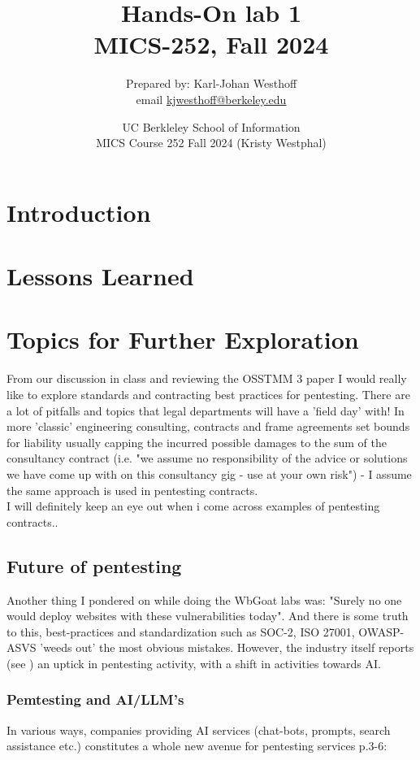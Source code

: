 \documentclass[
	letterpaper, %
	10pt, %
	unnumberedsections, %
	twoside, %
]{APAAssignment}
\title{Hands-On lab 1 \\ MICS-252, Fall 2024} %
\date{UC Berkleley School of Information \\
MICS Course 252 Fall 2024 (Kristy Westphal)
}
\author{
	Prepared by: Karl-Johan Westhoff \\
	email \href{mailto:kjwesthoff@berkeley.edu}{kjwesthoff@berkeley.edu}
}
\begin{document}
\onecolumn
\maketitle %


\section{Introduction}


\section{Lessons Learned}

\section{Topics for Further Exploration}
From our discussion in class and reviewing the OSSTMM 3 paper \cite{OSSTMM3} I would really like to explore standards and contracting best practices for pentesting. There are a lot of pitfalls and topics that legal departments will have a 'field day' with! In more 'classic' engineering consulting, contracts and frame agreements set bounds for liability usually capping the incurred possible damages to the sum of the consultancy contract (i.e. "we assume no responsibility of the advice or solutions we have come up with on this consultancy gig - use at your own risk") - I assume the same approach is used in pentesting contracts. \\ I will definitely keep an eye out when i come across examples of pentesting contracts.. 

\subsection{Future of pentesting}
Another thing I pondered on while doing the WbGoat labs was: "Surely no one would deploy websites with these vulnerabilities today". And there is some truth to this, best-practices and standardization such as SOC-2, ISO 27001, OWASP-ASVS \cite{OWASP-ASVS} 'weeds out' the most obvious mistakes. However, the industry itself reports (see \cite{Cobalt2024}) an uptick in pentesting activity, with a shift in activities towards AI.
\subsubsection{Pemtesting and AI/LLM's}
In various ways, companies providing AI services (chat-bots, prompts, search assistance etc.) constitutes a whole new avenue for pentesting services \cite{Cobalt2024}p.3-6: 
 
\end{document}
